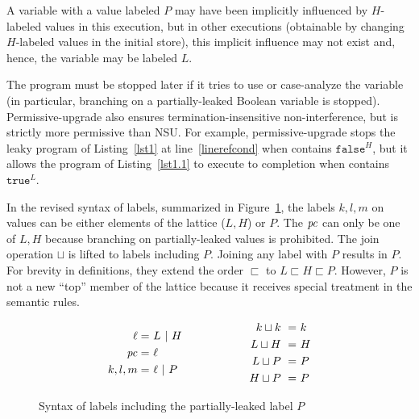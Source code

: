 \begin{framed}
\noindent
  A variable with a value labeled $P$ may have been implicitly
  influenced by $H$-labeled values in this execution, but in other
  executions (obtainable by changing $H$-labeled values in the
  initial store), this implicit influence may not exist and, hence,
  the variable may be labeled $L$.
\end{framed}

The program must be stopped later if it tries to use
or case-analyze the variable (in particular, branching on a
partially-leaked Boolean variable is stopped). Permissive-upgrade also
ensures termination-insensitive non-interference, but is strictly more
permissive than NSU. For example, permissive-upgrade stops the leaky
program of Listing~\ref{lst1} at line~\ref{linerefcond} when 
contains $\texttt{false}^H$, but it allows the program of
Listing~\ref{lst1.1} to execute to completion when  contains
$\texttt{true}^L$. 

In the revised syntax of labels, summarized in
Figure~\ref{pus:syntax}, the labels $k,l,m$ on values can be either
elements of the lattice  ($L, H$) or $P$. The $\mathit{pc}$ can only be one of
$L, H$ because branching on partially-leaked values is
prohibited. The join operation $\sqcup$ is lifted to labels including
$P$. Joining any label with $P$ results in $P$. For brevity in
definitions, they extend the order $\sqsubset$ to $L \sqsubset H
\sqsubset P$. However, $P$ is not a new ``top'' member of the lattice
because it receives special treatment in the semantic rules. 

\begin{figure}
\begin{equation*}
\begin{aligned}[c]
\ell          =~& L~\arrowvert~H\\
\mathit{pc}          =~& \ell\\
k,l,m =~& \ell~\arrowvert~P
\end{aligned}
\qquad \qquad \qquad
\begin{aligned}[c] 
k \sqcup k ~= ~& k\\
L \sqcup H ~=~ &H\\
L \sqcup P  ~=~&P \\
H\sqcup P  ~=~&P
\end{aligned}
\end{equation*}
\caption{Syntax of labels including the partially-leaked label
  $P$}\label{pus:syntax}
\end{figure}


